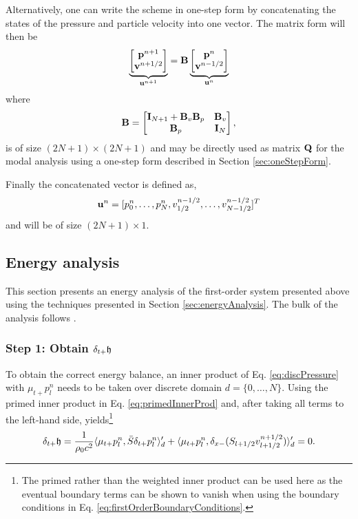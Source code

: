 {Alternatively, one can write the scheme in one-step form by concatenating the states of the pressure and particle velocity into one vector. The matrix form will then be 
\begin{equation}
    \underbrace{\begin{bmatrix}
        \mathbf{p}^{n+1}\\
        \mathbf{v}^{n+1/2}
    \end{bmatrix}}_{\mathbf{u}^{n+1}} = \mathbf{B}\underbrace{\begin{bmatrix}
        \mathbf{p}^{n}\\
        \mathbf{v}^{n-1/2}
    \end{bmatrix}}_{\mathbf{u}^{n}} 
\end{equation}
where
\begin{equation}
    \mathbf{B} = \begin{bmatrix}
        \mathbf{I}_{N+1}+\mathbf{B}_v\mathbf{B}_p & \mathbf{B}_v  \\
        \mathbf{B}_p & \mathbf{I}_{N}
    \end{bmatrix},
\end{equation}
is of size $(2N + 1) \times (2N + 1)$ and may be directly used as matrix $\mathbf{Q}$ for the modal analysis using a one-step form described in Section \ref{sec:oneStepForm}.

Finally the concatenated vector is defined as,
\begin{equation}
    \mathbf{u}^n = [p_0^n, \hdots, p_N^n, v_{1/2}^{n-1/2}, \hdots, v_{N-1/2}^{n-1/2}]^T
\end{equation}
and will be of size $(2N + 1) \times 1$. 

\subsection{Energy analysis}\label{eq:energyAnalysisFirstOrder}
This section presents an energy analysis of the first-order system presented above using the techniques presented in Section \ref{sec:energyAnalysis}. The bulk of the analysis follows \cite[Sec. 3.4.1, pp. 80--81]{Harrison2018}. 

\subsubsection{Step 1: Obtain $\delta_{t+} \mathfrak{h}$}
To obtain the correct energy balance, an inner product of Eq. \eqref{eq:discPressure} with $\mu_{t+}p_l^n$ needs to be taken over discrete domain $d = \{0, \hdots, N\}$. Using the primed inner product in Eq. \eqref{eq:primedInnerProd} and, after taking all terms to the left-hand side, yields\footnote{The primed rather than the weighted inner product can be used here as the eventual boundary terms can be shown to vanish when using the boundary conditions in Eq. \eqref{eq:firstOrderBoundaryConditions}.}
\begin{equation}\label{eq:firstOrderPrimed}
    \delta_{t+}\mathfrak{h} = \frac{1}{\rho_0 c^2}\langle \mu_{t+}p_l^n, \bar{S} \delta_{t+}p_l^n \rangle_{d}' +\langle \mu_{t+}p_l^n, \delta_{x-}(S_{l+1/2}v_{l+1/2}^{n+1/2})\rangle_{d}' = 0.
\end{equation}

}
